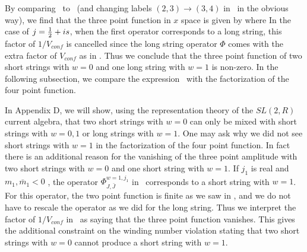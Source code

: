 By comparing \zamresm\ to  \corrmbasis\
(and changing labels $(2,3) \to (3,4)$
in \corrmbasis\ in the obvious way), we find that
 the three point function in $x$ space is given by
\eqn{}
where
\eqn{}
In the case of $j = {1 \over 2} + is$, when the first operator
corresponds to a long string, this factor of $1/V_{conf}$
is cancelled since the long string operator $\hat{\Phi}$ comes with
the extra factor of $V_{conf}$ as in \correcont .
Thus we conclude that the three point function of
two short strings with $w=0$ and one long string with
$w=1$ is non-zero. In the following subsection, we
compare the expression \threepx\ with the factorization
of the four point function.

In Appendix D, we will show, using the representation theory
of the $SL(2,R)$ current algebra, that two short strings
with $w=0$ can only be mixed with short strings with
$w=0, 1$ or long strings with $w=1$. One may ask why
we did not see short strings with $w=1$ in
the factorization of the four point function.
In fact there is an additional reason for the vanishing
of the three point amplitude with two short strings
with $w=0$ and one short string with $w=1$.
If $j_1$ is real and $m_1, \bar m_1 <0$ ,
the operator $\Phi^{w=1, j_1}_{J,\bar J}$ in \threepx\ corresponds to
a short string with $w=1$. For this operator, the two point function
is finite as we saw in \floweddis, and we do not have to rescale
the operator as we did for the long string.
Thus we interpret the factor of $1/V_{conf}$ in \threepx\ as saying that the
three point function vanishes. This gives the additional
constraint on the winding
number violation stating that two short strings with $w=0$ cannot
produce a short string with $w=1$.

